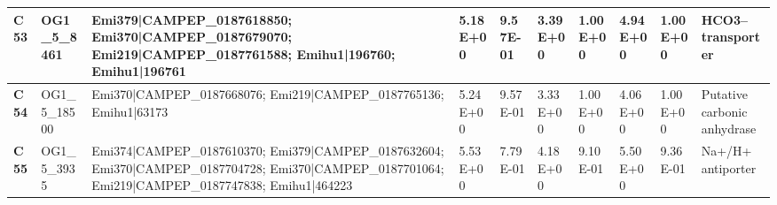 \begin{landscape}
\begin{center}
\begin{footnotesize}
\begin{longtable}{|p{0.5cm}|p{1.5cm}|p{4cm}|l|l|l|l|l|l|l|}
\textbf{C53} & OG1\_5\_8461  & Emi379|CAMPEP\_0187618850; Emi370|CAMPEP\_0187679070; Emi219|CAMPEP\_0187761588; Emihu1|196760; Emihu1|196761                                                                                                                                                                                                                                                                                                                                                                                                                                                                                                                            & 5.18E+00  & 9.57E-01 & 3.39E+00  & 1.00E+00 & 4.94E+00  & 1.00E+00 & HCO3--transporter                                                            \\ \hline
\textbf{C54} & OG1\_5\_18500 & Emi370|CAMPEP\_0187668076; Emi219|CAMPEP\_0187765136; Emihu1|63173                                                                                                                                                                                                                                                                                                                                                                                                                                                                                                                                                                       & 5.24E+00  & 9.57E-01 & 3.33E+00  & 1.00E+00 & 4.06E+00  & 1.00E+00 & Putative carbonic anhydrase                                                  \\ \hline
\textbf{C55} & OG1\_5\_3935  & Emi374|CAMPEP\_0187610370; Emi379|CAMPEP\_0187632604; Emi370|CAMPEP\_0187704728; Emi370|CAMPEP\_0187701064; Emi219|CAMPEP\_0187747838; Emihu1|464223                                                                                                                                                                                                                                                                                                                                                                                                                                                                                     & 5.53E+00  & 7.79E-01 & 4.18E+00  & 9.10E-01 & 5.50E+00  & 9.36E-01 & Na+/H+ antiporter                                                            \\ \hline

\end{longtable}
\end{footnotesize}
\end{center}
\end{landscape}

